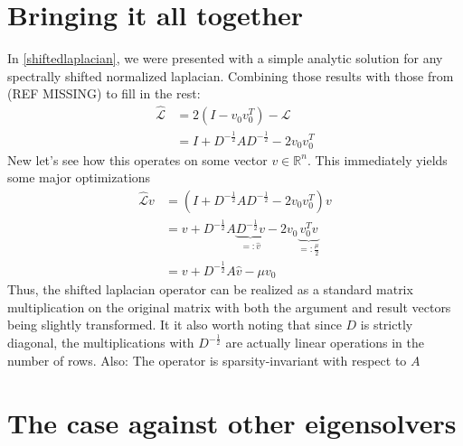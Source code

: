 \documentclass[10pt, a4paper, twocolumn]{article} %
\begin{document}
    \section{Bringing it all together}
    In \eqref{shiftedlaplacian}, we were presented with a simple analytic solution for any spectrally shifted normalized laplacian.
    Combining those results with those from (REF MISSING) to fill in the rest:
    \begin{equation}
        \begin{split}
            \hat{\mathcal{L}} & = 2 ( I - v_0 v_0^T ) - \mathcal{L}\\
            & = I + D^{-\frac{1}{2}} A D^{-\frac{1}{2}} - 2 v_0 v_0^T
        \end{split}
    \end{equation}
    New let's see how this operates on some vector $v \in \mathbb{R}^n$. This immediately yields some major optimizations
    \begin{equation}
        \begin{split}
            \hat{\mathcal{L}}v & = \left( I + D^{-\frac{1}{2}} A D^{-\frac{1}{2}} - 2 v_0 v_0^T\right) v\\
            & = v + D^{-\frac{1}{2}} A \underbrace{D^{-\frac{1}{2}} v}_{=:\hat{v}} - 2 v_0 \underbrace{v_0^T v}_{=:\frac{\mu}{2}}\\
            & = v + D^{-\frac{1}{2}} A \hat{v} - \mu v_0
        \end{split}
    \end{equation}
    Thus, the shifted laplacian operator can be realized as a standard matrix multiplication on the original matrix with both the
    argument and result vectors being slightly transformed. It it also worth noting that since $D$ is strictly diagonal, the multiplications with $D^{-\frac{1}{2}}$
    are actually linear operations in the number of rows. Also: The operator is sparsity-invariant with respect to $A$


    \section{The case against other eigensolvers}


    \printbibliography[title={Bibliography}]

\end{document}
